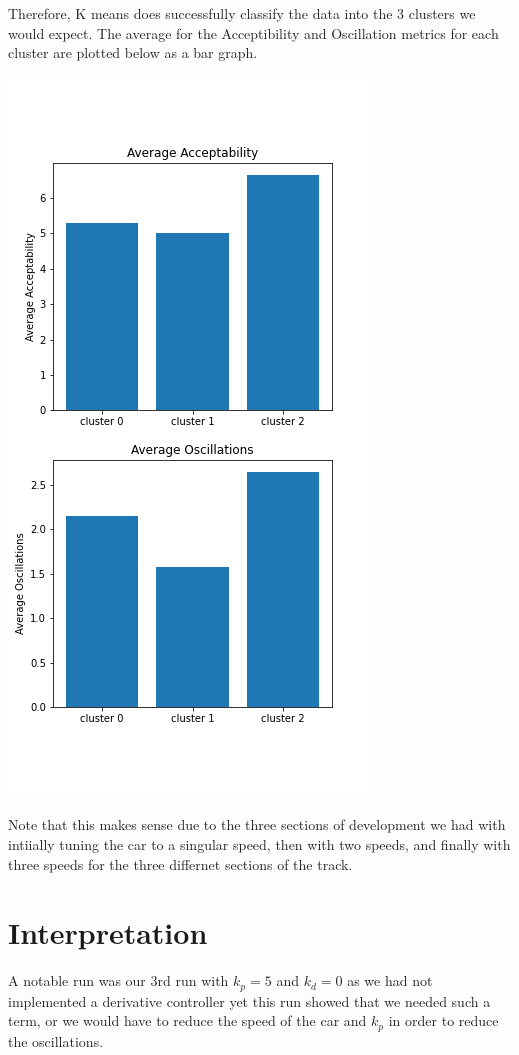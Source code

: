 \documentclass[12pt]{article}
\begin{document}
\begin{multicols}{2}
\begin{center}
\end{center}
Therefore, K means does successfully classify the data into the 3 clusters we would expect. The average for the Acceptibility and 
Oscillation metrics for each cluster are plotted below as a bar graph. 
\begin{center}
\includegraphics*[scale=0.3]{KpKiAllTSNEKMeansAverage.png}
\end{center}
Note that this makes sense due to the three sections of development we had with intiially tuning the car to a singular speed, then with two speeds, and 
finally with three speeds for the three differnet sections of the track. 
\section*{Interpretation}
A notable run was our 3rd run with $k_p=5$ and $k_d=0$ as we had not implemented a derivative controller yet
this run showed that we needed such a term, or we would have to reduce the speed of the car and $k_p$ in order to
reduce the oscillations. 


\end{multicols}
\end{document}
